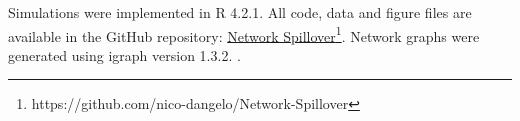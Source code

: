 \documentclass{article}
\theoremstyle{definition}
\begin{document}
        
%          
%         
%         
%          
%          
%          


         
%          


Simulations were implemented in R 4.2.1. All code, data and figure files are available in the GitHub repository: \href{https://github.com/nico-dangelo/Network-Spillover}{Network Spillover}\footnote{https://github.com/nico-dangelo/Network-Spillover}. Network graphs were generated using igraph version 1.3.2. \cite{csardi_igraph_2005}. 


\end{document}
